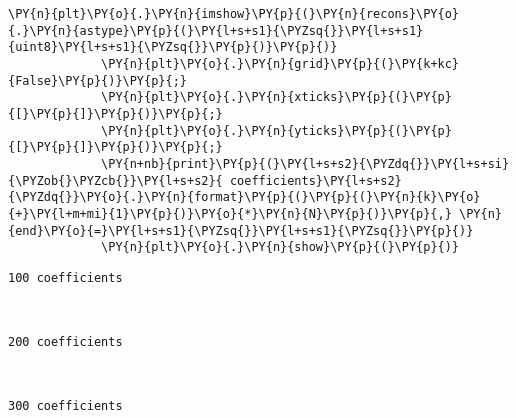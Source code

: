 \begin{Verbatim}[commandchars=\\\{\}]
             \PY{n}{plt}\PY{o}{.}\PY{n}{imshow}\PY{p}{(}\PY{n}{recons}\PY{o}{.}\PY{n}{astype}\PY{p}{(}\PY{l+s+s1}{\PYZsq{}}\PY{l+s+s1}{uint8}\PY{l+s+s1}{\PYZsq{}}\PY{p}{)}\PY{p}{)}
             \PY{n}{plt}\PY{o}{.}\PY{n}{grid}\PY{p}{(}\PY{k+kc}{False}\PY{p}{)}\PY{p}{;}
             \PY{n}{plt}\PY{o}{.}\PY{n}{xticks}\PY{p}{(}\PY{p}{[}\PY{p}{]}\PY{p}{)}\PY{p}{;}
             \PY{n}{plt}\PY{o}{.}\PY{n}{yticks}\PY{p}{(}\PY{p}{[}\PY{p}{]}\PY{p}{)}\PY{p}{;}
             \PY{n+nb}{print}\PY{p}{(}\PY{l+s+s2}{\PYZdq{}}\PY{l+s+si}{\PYZob{}\PYZcb{}}\PY{l+s+s2}{ coefficients}\PY{l+s+s2}{\PYZdq{}}\PY{o}{.}\PY{n}{format}\PY{p}{(}\PY{p}{(}\PY{n}{k}\PY{o}{+}\PY{l+m+mi}{1}\PY{p}{)}\PY{o}{*}\PY{n}{N}\PY{p}{)}\PY{p}{,} \PY{n}{end}\PY{o}{=}\PY{l+s+s1}{\PYZsq{}}\PY{l+s+s1}{\PYZsq{}}\PY{p}{)}
             \PY{n}{plt}\PY{o}{.}\PY{n}{show}\PY{p}{(}\PY{p}{)}
\end{Verbatim}


    \begin{Verbatim}[commandchars=\\\{\}]
100 coefficients
    \end{Verbatim}

    \begin{center}
    \end{center}
    { \hspace*{\fill} \\}
    
    \begin{Verbatim}[commandchars=\\\{\}]
200 coefficients
    \end{Verbatim}

    \begin{center}
    \end{center}
    { \hspace*{\fill} \\}
    
    \begin{Verbatim}[commandchars=\\\{\}]
300 coefficients
    \end{Verbatim}

    \begin{center}
    \end{center}
    { \hspace*{\fill} \\}
    
